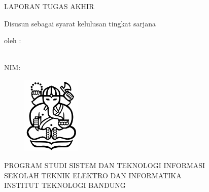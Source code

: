 \clearpage
\pagestyle{empty}

\begin{center}
\smallskip

    \Large \MakeUppercase{\bfseries \thetitle}
    \vfill

    \normalsize \MakeUppercase{Laporan Tugas Akhir}
    \vfill

    \normalsize Disusun sebagai syarat kelulusan tingkat sarjana
    \vfill

    \normalsize oleh :

    \normalsize \theauthor \\
    \normalsize NIM: \nim

    \vfill
    \begin{figure}[h]
        \centering
      	\includegraphics[width=0.25\textwidth]{aset/logo-itb.jpg}
    \end{figure}
    \vfill

    \large
    \uppercase{
        Program Studi Sistem dan Teknologi Informasi \\
        Sekolah Teknik Elektro dan Informatika \\
        Institut Teknologi Bandung \\
    }
    \yearsidang{}

\end{center}

\clearpage
